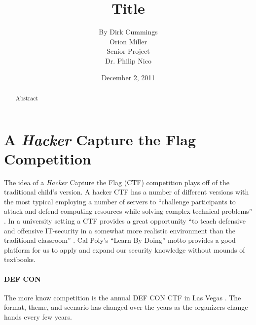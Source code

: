 \documentclass[10pt]{article}
\begin{document}
\title{\vfill Title}
\author{
 By Dirk Cummings \vspace{10pt} \\
 Orion Miller \vspace{10pt} \\ 
Senior Project  \vspace{10pt} \\ 
Dr. Philip Nico \vspace{10pt} \\ 
}
\date{December 2, 2011}

\maketitle

\vfill  %
\begin{abstract}
Abstract
\end{abstract}

\thispagestyle{empty} %

\newpage

\thispagestyle{empty}  %
\tableofcontents

\newpage
\setcounter{page}{1}

\section{A \textit{Hacker} Capture the Flag Competition}
The idea of a \textit{Hacker} Capture the Flag (CTF) competition plays off of
the traditional child's version. A hacker CTF has a number of different versions
with the most typical employing a number of servers to ``challenge participants
to attack and defend computing resources while solving complex technical
problems'' \cite{HackingCompetitionsForSecurityEducation}. In a university
setting a CTF provides a great opportunity ``to teach defensive and offensive
IT-security in a somewhat more realistic environment than the traditional
classroom'' \cite{HostingHackingChallenge}. Cal Poly's ``Learn By Doing'' motto
provides a good platform for us to apply and expand our security knowledge
without mounds of textbooks.

\paragraph*{DEF CON} The more know competition is the annual DEF CON CTF
in Las Vegas \cite{DEFCONCTF}. The format, theme, and scenario has changed over
the years as the organizers change hands every few years. 
\end{document}
